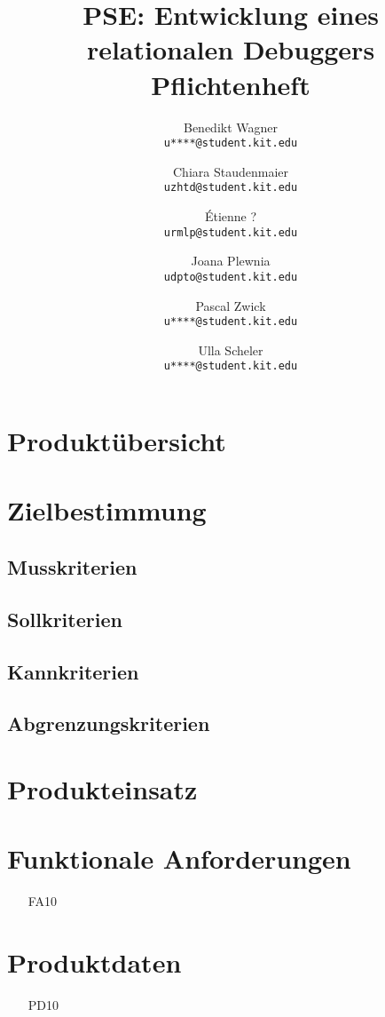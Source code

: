 \documentclass[parskip=full]{scrartcl}
\title{PSE: Entwicklung eines relationalen Debuggers\\ Pflichtenheft}
\author{
	Benedikt Wagner\\
	\texttt{u****@student.kit.edu}
	\and Chiara Staudenmaier\\
	\texttt{uzhtd@student.kit.edu}
	\and Étienne ?\\
	\texttt{urmlp@student.kit.edu}
	\and Joana Plewnia\\
	\texttt{udpto@student.kit.edu} 
	\and Pascal Zwick\\
	\texttt{u****@student.kit.edu}
	\and Ulla Scheler\\
	\texttt{u****@student.kit.edu}
}
\begin{document}
\maketitle

\section{Produktübersicht}

\section{Zielbestimmung}
\subsection{Musskriterien}
\subsection{Sollkriterien}
\subsection{Kannkriterien}
\subsection{Abgrenzungskriterien}

\section{Produkteinsatz}

\section{Funktionale Anforderungen}
\begin{itemize}[nosep]
\item[FA10] %
\end{itemize}

\section{Produktdaten}
\begin{itemize}[nosep]
\item[PD10] %
\end{itemize}
\end{document}
